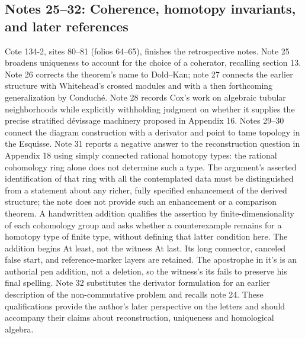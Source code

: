 \documentclass[10pt,oneside]{book}
\begin{document}
\subsection*{Notes 25--32: Coherence, homotopy invariants, and later references}
Cote 134-2, sites 80--81 (folios 64--65), finishes the retrospective notes. Note 25 broadens uniqueness to account for the choice of a coherator, recalling section 13. Note 26 corrects the theorem's name to Dold--Kan; note 27 connects the earlier structure with Whitehead's crossed modules and with a then forthcoming generalization by Conduché. Note 28 records Cox's work on algebraic tubular neighborhoods while explicitly withholding judgment on whether it supplies the precise stratified dévissage machinery proposed in Appendix 16. Notes 29--30 connect the diagram construction with a derivator and point to tame topology in the Esquisse. Note 31 reports a negative answer to the reconstruction question in Appendix 18 using simply connected rational homotopy types: the rational cohomology ring alone does not determine such a type. The argument's asserted identification of that ring with all the contemplated data must be distinguished from a statement about any richer, fully specified enhancement of the derived structure; the note does not provide such an enhancement or a comparison theorem. A handwritten addition qualifies the assertion by finite-dimensionality of each cohomology group and asks whether a counterexample remains for a homotopy type of finite type, without defining that latter condition here. The addition begins At least, not the witness At last. Its long connector, canceled false start, and reference-marker layers are retained. The apostrophe in it's is an authorial pen addition, not a deletion, so the witness's its fails to preserve his final spelling. Note 32 substitutes the derivator formulation for an earlier description of the non-commutative problem and recalls note 24. These qualifications provide the author's later perspective on the letters and should accompany their claims about reconstruction, uniqueness and homological algebra.
\end{document}
